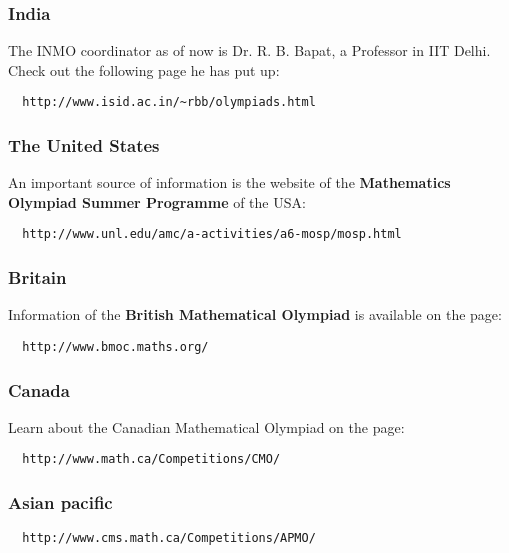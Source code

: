 \documentclass[a4paper]{amsart}
\begin{document}
\subsubsection{India}

The INMO coordinator as of now is Dr. R. B. Bapat, a Professor in IIT Delhi. Check out the following page he has put up:

\begin{verbatim}
  http://www.isid.ac.in/~rbb/olympiads.html
\end{verbatim}

\subsubsection{The United States}

An important source of information is the website of the
{\bf Mathematics Olympiad Summer Programme} of the USA:

\begin{verbatim}
  http://www.unl.edu/amc/a-activities/a6-mosp/mosp.html
\end{verbatim}

\subsubsection{Britain}

Information of the {\bf British Mathematical Olympiad} is available on the page:

\begin{verbatim}
  http://www.bmoc.maths.org/
\end{verbatim}

\subsubsection{Canada}

Learn about the Canadian Mathematical Olympiad on the page:

\begin{verbatim}
  http://www.math.ca/Competitions/CMO/
\end{verbatim}

\subsubsection{Asian pacific}

\begin{verbatim}
  http://www.cms.math.ca/Competitions/APMO/
\end{verbatim}
\end{document}

